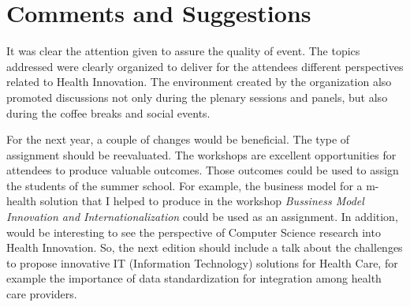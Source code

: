 \section{Comments and Suggestions}

It was clear the attention given to assure the quality of event. The topics addressed were clearly organized to deliver for the attendees different perspectives related to Health Innovation. The environment created by the organization also promoted discussions not only during the plenary sessions and panels, but also during the coffee breaks and social events. 
 
For the next year, a couple of changes would be beneficial.
The type of assignment should be reevaluated. The workshops are excellent opportunities for attendees to produce valuable outcomes. Those outcomes could be used to assign the students of the summer school. 
For example, the business model for a m-health solution that I helped to produce in the workshop \textit{Bussiness Model Innovation and Internationalization} could be used as an assignment.
In addition, would be interesting to see the perspective of Computer Science research into Health Innovation. 
So, the next edition should include a talk about the challenges to propose innovative IT (Information Technology) solutions for Health Care, for example the importance of data standardization for integration among health care providers.